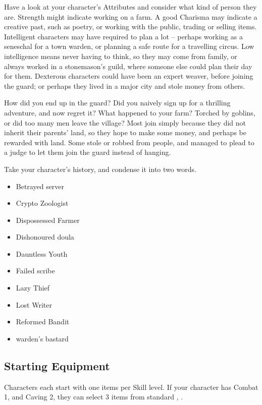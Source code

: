 \begin{multicols}{2}
Have a look at your character's Attributes and consider what kind of person they are.
Strength might indicate working on a farm.
A good Charisma may indicate a creative past, such as poetry, or working with the public, trading or selling items.
Intelligent characters may have required to plan a lot -- perhaps working as a seneschal for a town \gls{warden}, or planning a safe route for a travelling circus.
Low intelligence means never having to think, so they may come from  family, or always worked in a stonemason's guild, where someone else could plan their day for them.
Dexterous characters could have been an expert weaver, before joining the \gls{guard}; or perhaps they lived in a major city and stole money from others.

How did you end up in the \gls{guard}?
Did you naively sign up for a thrilling adventure, and now regret it?
What happened to your farm?
Torched by goblins, or did too many men leave the \gls{village}?
Most join simply because they did not inherit their parents' land, so they hope to make some money, and perhaps be rewarded with land.
Some stole or robbed from people, and managed to plead to a judge to let them join the \gls{guard} instead of hanging.

Take your character's history, and condense it into two words.

\begin{multicols}{2}
\begin{itemize}
  \item
  Betrayed \Gls{server}
  \item
  Crypto Zoologist
  \item
  Dispossessed Farmer
  \item
  Dishonoured \Gls{doula}
  \item
  Dauntless Youth
  \item
  Failed \Gls{scribe}
  \item
  Lazy Thief
  \item
  Lost Writer
  \item
  Reformed Bandit
  \item
  \Gls{warden}'s bastard
\end{itemize}
\end{multicols}

\subsection{Starting Equipment}

Characters each start with one items per Skill level.
If your character has Combat 1, and Caving 2, they can select 3 items from standard , .


\end{multicols}
